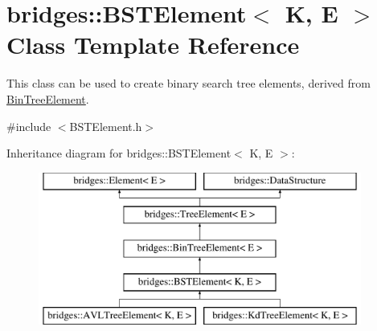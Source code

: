 \hypertarget{classbridges_1_1_b_s_t_element}{}\section{bridges\+:\+:B\+S\+T\+Element$<$ K, E $>$ Class Template Reference}
\label{classbridges_1_1_b_s_t_element}


This class can be used to create binary search tree elements, derived from \hyperlink{classbridges_1_1_bin_tree_element}{Bin\+Tree\+Element}.  




{\ttfamily \#include $<$B\+S\+T\+Element.\+h$>$}

Inheritance diagram for bridges\+:\+:B\+S\+T\+Element$<$ K, E $>$\+:\begin{figure}[H]
\begin{center}
\leavevmode
\includegraphics[height=5.000000cm]{classbridges_1_1_b_s_t_element}
\end{center}
\end{figure}
